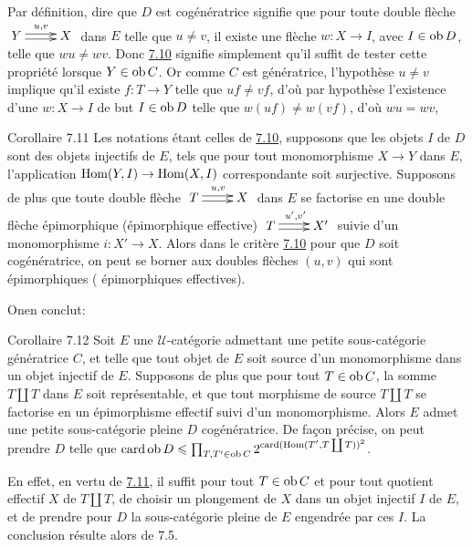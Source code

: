 \documentclass[10pt]{../fichiers-configuration-latex/smfart}
\begin{document}
Par définition, dire que $D$ est cogénératrice signifie que pour
toute double flèche $\xymatrix{ Y\ar@<2pt>[r]^{u,v}\ar@<-2pt>[r]& X
}$ dans $E$ telle que $u\neq v$, il existe une flèche
$w:X\rightarrow I$, avec $I\in\operatorname{ob} D$, telle que $wu\neq wv$. Donc
\hyperref[I.prop7.10]{7.10} signifie simplement qu'il suffit de tester cette
propriété lorsque $Y\in \operatorname{ob} C$. Or comme $C$ est génératrice,
l'hypothèse $u\neq v$ implique qu'il existe $f:T\rightarrow Y$ telle
que $uf\neq vf$, d'où par hypothèse l'existence d'une
$w:X\rightarrow I$ de but $I\in\operatorname{ob} D$ telle que $w(uf)\neq w(vf)$,
d'où $wu=wv$, \cqfd

\begin{enonce*}{Corollaire 7.11}
Les notations étant celles de \hyperref[I.prop7.10]{7.10}, supposons que les
objets $I$ de $D$ sont des objets injectifs de $E$, \ie tels que
pour tout monomorphisme $X\rightarrow Y$ dans $E$, l'application
$\operatorname{Hom}(Y,I)\rightarrow \operatorname{Hom}(X,I)$ correspondante soit surjective.
Supposons de plus que toute double flèche $\xymatrix{
T\ar@<2pt>[r]^{u,v}\ar@<-2pt>[r]& X }$ dans $E$ se factorise en une
double flèche épimorphique (\resp épimorphique effective)
$\xymatrix{ T\ar@<2pt>[r]^{u',v'}\ar@<-2pt>[r]& X' }$ suivie d'un
monomorphisme $i:X'\rightarrow X$. Alors dans le critère
\hyperref[I.prop7.10]{7.10} pour que $D$ soit cogénératrice, on peut se borner
aux doubles flèches $(u,v)$ qui sont épimorphiques (\resp
épimorphiques effectives).
\end{enonce*}

On\pageoriginale en conclut:

\begin{enonce*}{Corollaire 7.12}
Soit $E$ une $𝒰$-catégorie admettant une petite
sous-catégorie génératrice $C$, et telle que tout objet de $E$ soit
source d'un monomorphisme dans un objet injectif de $E$. Supposons
de plus que pour tout $T\in\operatorname{ob} C$, la somme $T\amalg T$ dans $E$
soit représentable, et que tout morphisme de source $T\amalg T$ se
factorise en un épimorphisme effectif suivi d'un monomorphisme.
Alors $E$ admet une petite sous-catégorie pleine $D$ cogénératrice.
De façon précise, on peut prendre $D$ telle que $\operatorname{card} \operatorname{ob} D\leqslant
\prod_{T,T'\in \operatorname{ob} C}2^{\operatorname{card}(\operatorname{Hom}(T',T\coprod T))^2}$.
\end{enonce*}

En effet, en vertu de \hyperref[I.cor7.11]{7.11}, il suffit pour tout $T\in \operatorname{ob} C$ et pour
tout quotient effectif $X$ de $T\amalg T$, de choisir un plongement
de $X$ dans un objet injectif $I$ de $E$, et de prendre pour $D$ la
sous-catégorie pleine de $E$ engendrée par ces $I$. La conclusion
résulte alors de 7.5.
\end{document}
